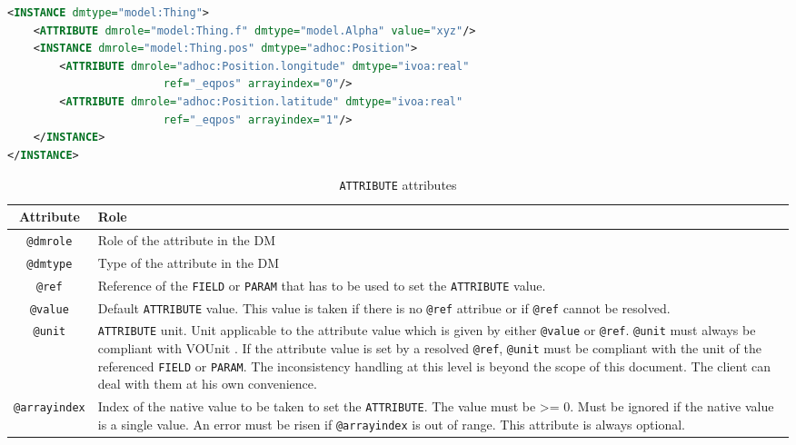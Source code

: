     
\begin{lstlisting}[caption={ATTRIBUTE examples},language=XML]
<INSTANCE dmtype="model:Thing">
    <ATTRIBUTE dmrole="model:Thing.f" dmtype="model.Alpha" value="xyz"/>		
    <INSTANCE dmrole="model:Thing.pos" dmtype="adhoc:Position">
        <ATTRIBUTE dmrole="adhoc:Position.longitude" dmtype="ivoa:real" 
                        ref="_eqpos" arrayindex="0"/>
        <ATTRIBUTE dmrole="adhoc:Position.latitude" dmtype="ivoa:real" 
                        ref="_eqpos" arrayindex="1"/>
    </INSTANCE>
</INSTANCE>
\end{lstlisting}  


\begin{table}[!htbp]
\small
\centering
\begin{tabulary}{\linewidth}{|c|J|}       
       \hline 
            \textbf{Attribute} & 
            \textbf {Role}\\
       \hline         \hline  
            \texttt{@dmrole} & 
            Role of the attribute in the DM\\
        \hline 
            \texttt{@dmtype} & 
            Type of the attribute in the DM\\
        \hline 
            \texttt{@ref} & 
            Reference of the \texttt{FIELD} or \texttt{PARAM} that has to be used to set the 
            \texttt{ATTRIBUTE} value.\\
        \hline 
            \texttt{@value}  &
            Default \texttt{ATTRIBUTE} value. This value is taken if there is no 
            \texttt{@ref} attribue or if \texttt{@ref} cannot be resolved.\\
        \hline 
            \texttt{@unit} & 
            \texttt{ATTRIBUTE} unit. Unit applicable to the attribute value which is given 
            by either \texttt{@value} or \texttt{@ref}. \texttt{@unit} must always 
            be compliant with VOUnit \citep{2014ivoa.spec.0523D}. 
            If the attribute value is set by a resolved \texttt{@ref}, 
            \texttt{@unit} must be compliant with the unit of the referenced
            \texttt{FIELD} or \texttt{PARAM}. The inconsistency handling at 
            this level is beyond the scope of this document. The client can 
            deal with them at his own convenience.\\
        \hline 
            \texttt{@arrayindex} & 
            Index of the native value to be taken to set the \texttt{ATTRIBUTE}. 
            The value must be >= 0.
            Must be ignored if the native value is a single value. 
            An error must be risen if \texttt{@arrayindex} is out of range.
            This attribute is always optional.\\
        \hline 
     \end{tabulary}
     \caption{\texttt{ATTRIBUTE} attributes} 
     \label{tbl:attribute-att}
 \end{table}

